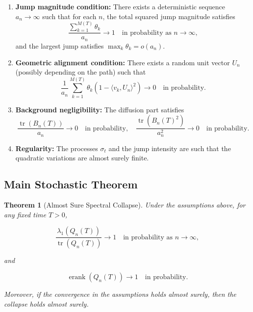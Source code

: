 \documentclass{article}
\newtheorem{theorem}{Theorem}
\begin{document}
\begin{enumerate}
\item \textbf{Jump magnitude condition:} There exists a deterministic sequence \(a_n \to \infty\) such that for each \(n\), the total squared jump magnitude satisfies
\[
\frac{\sum_{k=1}^{M(T)} \theta_k}{a_n} \to 1 \quad \text{in probability as } n \to \infty,
\]
and the largest jump satisfies \(\max_k \theta_k = o(a_n)\).

\item \textbf{Geometric alignment condition:} There exists a random unit vector \(U_n\) (possibly depending on the path) such that
\[
\frac{1}{a_n} \sum_{k=1}^{M(T)} \theta_k \left(1 - \langle v_k, U_n \rangle^2\right) \to 0 \quad \text{in probability}.
\]

\item \textbf{Background negligibility:} The diffusion part satisfies
\[
\frac{\operatorname{tr}(B_n(T))}{a_n} \to 0 \quad \text{in probability}, \quad \frac{\operatorname{tr}(B_n(T)^2)}{a_n^2} \to 0 \quad \text{in probability}.
\]

\item \textbf{Regularity:} The processes \(\sigma_t\) and the jump intensity are such that the quadratic variations are almost surely finite.
\end{enumerate}

\subsection{Main Stochastic Theorem}

\begin{theorem}[Almost Sure Spectral Collapse]
Under the assumptions above, for any fixed time \(T > 0\),

\[
\frac{\lambda_1(Q_n(T))}{\operatorname{tr}(Q_n(T))} \to 1 \quad \text{in probability as } n \to \infty,
\]

and

\[
\operatorname{erank}(Q_n(T)) \to 1 \quad \text{in probability}.
\]

Moreover, if the convergence in the assumptions holds almost surely, then the collapse holds almost surely.
\end{theorem}
\end{document}
